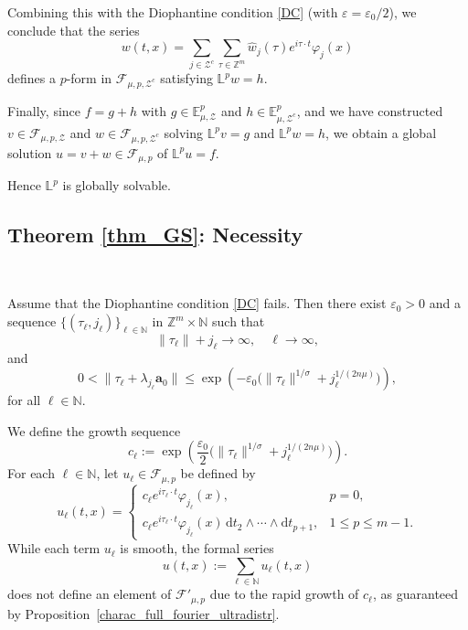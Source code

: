 \documentclass[12pt,reqno]{amsart}
\theoremstyle{definition}
\numberwithin{equation}{section}
\begin{document}
Combining this with the Diophantine condition \eqref{DC} (with $\varepsilon = \varepsilon_0/2$), we conclude that the series
\[
w(t,x) = \sum_{j \in \mathcal{Z}^c} \sum_{\tau \in \mathbb{Z}^m} \widehat{w}_j(\tau) e^{i \tau \cdot t} \varphi_j(x)
\]
defines a $p$-form in $\mathscr{F}_{\mu,p,\mathcal{Z}^c}$ satisfying $\mathbb{L}^p w = h$.

Finally, since $f = g + h$ with $g \in \mathbb{E}^p_{\mu,\mathcal{Z}}$ and $h \in \mathbb{E}^p_{\mu,\mathcal{Z}^c}$, and we have constructed $v \in \mathscr{F}_{\mu,p,\mathcal{Z}}$ and $w \in \mathscr{F}_{\mu,p,\mathcal{Z}^c}$ solving $\mathbb{L}^p v = g$ and $\mathbb{L}^p w = h$, we obtain a global solution $u = v + w \in \mathscr{F}_{\mu,p}$ of $\mathbb{L}^p u = f$.

	Hence $\mathbb{L}^p$ is globally solvable.

\subsection{Theorem \ref{thm_GS}: Necessity} \


Assume that the Diophantine condition \eqref{DC} fails. Then there exist
$\varepsilon_0>0$ and a sequence $\{(\tau_\ell,j_\ell)\}_{\ell\in\mathbb{N}}$ in $\mathbb{Z}^m\times\mathbb{N}$ such that
\begin{equation*}
	\|\tau_\ell\|+j_\ell\to\infty,\quad \ell\to\infty,
\end{equation*}
and
\begin{equation}\label{non_DC}
	0<\|\tau_\ell+\lambda_{j_\ell}\boldsymbol{a}_0\|
	\leq \exp\!\left(-\varepsilon_0\Big(\|\tau_\ell\|^{1/\sigma}
	+ j_\ell^{1/(2n\mu)}\Big)\right),
\end{equation}
for all $\ell\in\mathbb{N}$.


We define the growth sequence
\[
c_\ell := \exp\!\left(\frac{\varepsilon_0}{2}\Big(\|\tau_\ell\|^{1/\sigma} + j_\ell^{1/(2n\mu)}\Big)\right).
\]
For each $\ell \in \mathbb{N}$, let $u_\ell \in \mathscr{F}_{\mu,p}$ be defined by
\[
u_\ell(t,x) =
\begin{cases}
	c_\ell e^{i\tau_\ell \cdot t}\varphi_{j_\ell}(x), & p=0,\\[2mm]
	c_\ell e^{i\tau_\ell \cdot t}\varphi_{j_\ell}(x)\, \mathrm{d}t_2 \wedge \cdots \wedge \mathrm{d}t_{p+1}, & 1 \le p \le m-1.
\end{cases}
\]
While each term $u_\ell$ is smooth, the formal series
\[
u(t,x) := \sum_{\ell \in \mathbb{N}} u_\ell(t,x)
\]
does not define an element of $\mathscr{F}'_{\mu,p}$ due to the rapid growth of $c_\ell$, as guaranteed by Proposition~\ref{charac_full_fourier_ultradistr}.
\end{document}
